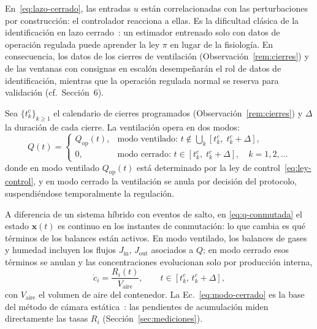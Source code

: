 \begin{remark}
\label{rem:id-lazo}
En~\eqref{eq:lazo-cerrado}, las entradas $u$ est\'an correlacionadas con las perturbaciones por construcci\'on: el controlador reacciona a ellas. Es la dificultad cl\'asica de la identificaci\'on en lazo cerrado~\citep{ljungSystemIdentification1999}: un estimador entrenado solo con datos de operaci\'on regulada puede aprender la ley $\pi$ en lugar de la fisiolog\'ia. En consecuencia, los datos de los cierres de ventilaci\'on (Observaci\'on~\ref{rem:cierres}) y de las ventanas con consignas en escal\'on desempe\~nar\'an el rol de datos de identificaci\'on, mientras que la operaci\'on regulada normal se reserva para validaci\'on (cf.~Secci\'on~6).
\end{remark}


\begin{definition}
\label{def42}
Sea $\{t_k^c\}_{k \geq 1}$ el calendario de cierres programados (Observaci\'on~\ref{rem:cierres}) y $\Delta$ la duraci\'on de cada cierre. La ventilaci\'on opera en dos modos:
\begin{equation}
Q(t) =
\begin{cases}
Q_{\mathrm{op}}(t), & \text{modo ventilado: } t \notin \bigcup_k [t_k^c,\; t_k^c + \Delta],\\[4pt]
0, & \text{modo cerrado: } t \in [t_k^c,\; t_k^c + \Delta], \quad k = 1, 2, \ldots
\end{cases}
\label{eq:q-conmutada}
\end{equation}
donde en modo ventilado $Q_{\mathrm{op}}(t)$ est\'a determinado por la ley de control~\eqref{eq:ley-control}, y en modo cerrado la ventilaci\'on se anula por decisi\'on del protocolo, suspendi\'endose temporalmente la regulaci\'on.
\end{definition}

\begin{remark}\label{rem:conmutacion}
A diferencia de un sistema híbrido con eventos de salto, en
\eqref{eq:q-conmutada} el estado $\mathbf{x}(t)$ es continuo en los
instantes de conmutación: lo que cambia es qué términos de los balances
están activos. En modo ventilado, los balances de gases y humedad incluyen
los flujos $J_{\mathrm{in}}$, $J_{\mathrm{out}}$ asociados a $Q$; en modo
cerrado esos términos se anulan y las concentraciones evolucionan solo por
producción interna,
\begin{equation}
\dot{c}_i = \frac{R_i(t)}{V_{\mathrm{aire}}},
\qquad t \in [t_k^{c},\, t_k^{c} + \Delta],
\label{eq:modo-cerrado}
\end{equation}
con $V_{\mathrm{aire}}$ el volumen de aire del contenedor. La
Ec.~\eqref{eq:modo-cerrado} es la base del método de cámara estática~\citep{hutchinsonImprovedSoilCover1981,ermolaevGreenhouseGasEmissions2019}: las
pendientes de acumulación miden directamente las tasas $R_i$
(Sección~\ref{sec:mediciones}).
\end{remark}

